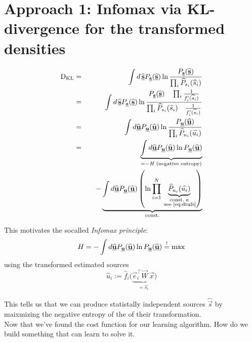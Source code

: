 \section{Approach 1: Infomax via KL-divergence for the transformed densities}
\begin{eqnarray}
  \dkl & = & \int d \, \widehat{\vec{s}} P_{\vec{s}}(\widehat{\vec{s}}) \ln \frac{P_{\vec{s}}(\widehat{\vec{s}})}{\prod_i \widehat{P}_{s_i}(\widehat{s}_i)}\\
  & = &  \int d \, \widehat{\vec{s}} P_{\vec{s}}(\widehat{\vec{s}}) \ln 
  \frac
  {P_{\vec{s}}(\widehat{\vec{s}}) \quad \prod_i \frac{1}{f_i' (\widehat{s}_i)}}
  {\prod_i \widehat{P}_{s_i}(\widehat{s}_i) \quad \frac{1}{f_i' (\widehat{s}_i)}} \\
  & = & \int d \widehat{\vec{u}} P_{\vec{u}} (\widehat{\vec{u}}) 
  \ln 
  \frac
  {P_{\vec{u}} (\widehat{\vec{u}}) }
  {\prod_i  \widehat{P}_{u_i}(\widehat{u_i})} \\
  & = & 
  \underbrace{
	  \int d \widehat{\vec{u}} P_{\vec{u}} (\widehat{\vec{u}}) 
	  \ln 
	  {P_{\vec{u}} (\widehat{\vec{u}}) }
  }_{= -H \; \text{(negative entropy)}}\\
  & & \quad -
  \underbrace{
	  \int d \widehat{\vec{u}} P_{\vec{u}} (\widehat{\vec{u}}) 
	  \left( \ln
	  {\prod_{i=1}^{N}
	  \underbrace{ 
		\widehat{P}_{u_i}(\widehat{u_i}) 
	  }_{\substack{\text{const.\;} a \\\text{\;see \eqref{eq:dtufs}}}}} 
	  \right)
	  }_{\text{const.}}
\end{eqnarray}

This motivates the socalled \emph{Infomax principle}:
\begin{equation}\label{eq:infomax}
  H = -\int d \widehat{\underline{\mathbf{u}}} P_{\underline{\mathbf{u}}} (\widehat{\underline{\mathbf{u}}})
  \ln P_{\underline{\mathbf{u}}} (\widehat{\underline{\mathbf{u}}}) \stackrel{\mathrm{!}}{=} \max 
\end{equation}
using the transformed estimated sources
\begin{equation}
\widehat{u}_i := \widehat{f}_i \big( \underbrace{ \vec{e}_i^\top
		\vec{W} \, \vec{x}  }_{= \widehat{s_i} } \big) 
\end{equation}

This tells us that we can produce statistally independent sources $\widehat {\vec s}$ 
by maixmizing the negative entropy of the of their transformation.\\
Now that we've found the cost function for our learning algorithm. 
How do we build something that can learn to solve it.

